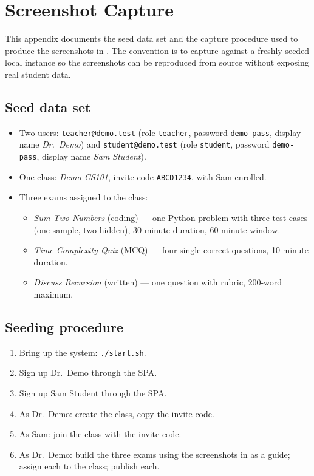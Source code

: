 \chapter{Screenshot Capture}
\label{appendix:screenshots-extra}

This appendix documents the seed data set and the capture procedure used to produce the screenshots in . The convention is to capture against a freshly-seeded local instance so the screenshots can be reproduced from source without exposing real student data.

\section{Seed data set}

\begin{itemize}
  \item Two users: \texttt{teacher@demo.test} (role \texttt{teacher}, password \texttt{demo-pass}, display name \emph{Dr.~Demo}) and \texttt{student@demo.test} (role \texttt{student}, password \texttt{demo-pass}, display name \emph{Sam Student}).
  \item One class: \emph{Demo CS101}, invite code \texttt{ABCD1234}, with Sam enrolled.
  \item Three exams assigned to the class:
    \begin{itemize}
      \item \emph{Sum Two Numbers} (coding) --- one Python problem with three test cases (one sample, two hidden), 30-minute duration, 60-minute window.
      \item \emph{Time Complexity Quiz} (MCQ) --- four single-correct questions, 10-minute duration.
      \item \emph{Discuss Recursion} (written) --- one question with rubric, 200-word maximum.
    \end{itemize}
\end{itemize}

\section{Seeding procedure}

\begin{enumerate}
  \item Bring up the system: \texttt{./start.sh}.
  \item Sign up Dr.~Demo through the SPA.
  \item Sign up Sam Student through the SPA.
  \item As Dr.~Demo: create the class, copy the invite code.
  \item As Sam: join the class with the invite code.
  \item As Dr.~Demo: build the three exams using the screenshots in  as a guide; assign each to the class; publish each.
\end{enumerate}


